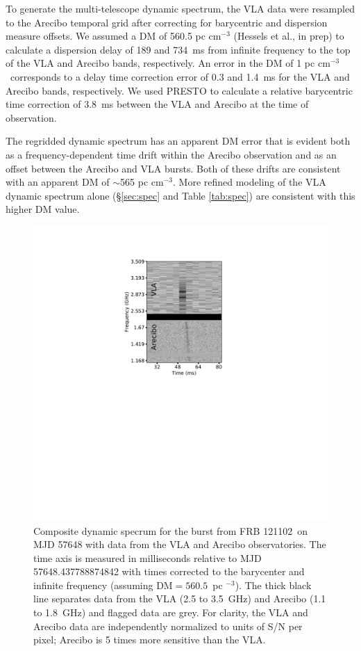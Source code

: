 \documentclass[twocolumn]{aastex61}
\newcommand{\frb}{FRB 121102}
\begin{document}
To generate the multi-telescope dynamic spectrum, the VLA data were resampled to the Arecibo temporal grid after correcting for barycentric and dispersion measure offsets. We assumed a DM of 560.5 pc cm$^{-3}$ (Hessels et al., in prep) to calculate a dispersion delay of 189 and 734~ms from infinite frequency to the top of the VLA and Arecibo bands, respectively. An error in the DM of 1 pc cm$^{-3}$\ corresponds to a delay time correction error of 0.3 and 1.4~ms for the VLA and Arecibo bands, respectively. We used PRESTO to calculate a relative barycentric time correction of 3.8~ms between the VLA and Arecibo at the time of observation.

The regridded dynamic spectrum has an apparent DM error that is evident both as a frequency-dependent time drift within the Arecibo observation and as an offset between the Arecibo and VLA bursts. Both of these drifts are consistent with an apparent DM of $\sim$565 pc cm$^{-3}$. More refined modeling of the VLA dynamic spectrum alone (\S \ref{sec:spec} and Table \ref{tab:spec}) are consistent with this higher DM value.

\begin{figure}[htb]
\begin{center}
 \includegraphics[trim=250 400 250 80, clip, width=\columnwidth]{aovla_spec.pdf}
 \caption{Composite dynamic specrum for the burst from \frb\ on MJD 57648 with data from the VLA and Arecibo observatories. The time axis is measured in milliseconds relative to MJD 57648.437788874842 with times corrected to the barycenter and infinite frequency (assuming DM$=560.5$\ pc $^{-3}$). The thick black line separates data from the VLA (2.5 to 3.5~GHz) and Arecibo (1.1 to 1.8~GHz) and flagged data are grey. For clarity, the VLA and Arecibo data are independently normalized to units of S/N per pixel; Arecibo is 5 times more sensitive than the VLA.
 \label{fig:sgram}}
\end{center}
\end{figure}
\end{document}
